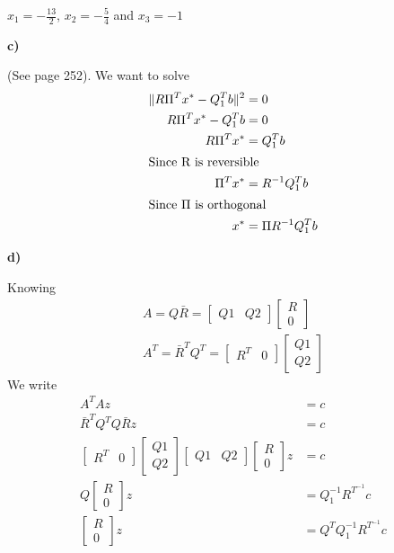 $x_1 = -\frac{13}{2}$, $x_2 = -\frac{5}{4}$ and $x_3 = -1$

\textbf{c)}

\answer

(See page 252). We want to solve 
\begin{align*}
	\| R \Pi^T x^* - Q_1^Tb\|^2 &= 0 \\
	R \Pi^T x^* - Q_1^Tb &= 0 \\
	R \Pi^T x^* &= Q_1^Tb \\
\intertext{Since R is reversible}
	\Pi^T x^*  &= R^{-1}Q_1^Tb \\
\intertext{Since $\Pi$ is orthogonal}
	x^* &= \Pi R^{-1}Q_1^Tb
\end{align*}
	
\textbf{d)}

\answer

Knowing
\begin{align*}
	A = Q\bar{R} = \begin{bmatrix}
		Q1 & Q2
	\end{bmatrix} \begin{bmatrix}
		R \\ 0
	\end{bmatrix}\\
	A^T = \bar{R}^T Q^T = \begin{bmatrix}
		R^T & 0
	\end{bmatrix}\begin{bmatrix}
		Q1\\ Q2
	\end{bmatrix}
\end{align*}
We write
\begin{align*}
	A^T A z &= c \\
	\bar{R}^T Q^T Q\bar{R}z &= c \\
	\begin{bmatrix}
		R^T & 0
	\end{bmatrix}\begin{bmatrix}
		Q1\\ Q2
	\end{bmatrix} \begin{bmatrix}
		Q1 & Q2
	\end{bmatrix} \begin{bmatrix}
		R \\ 0
	\end{bmatrix} z &= c\\
	Q\begin{bmatrix}
		R \\ 0
	\end{bmatrix} z &= Q_1^{-1}R^{T^{-1}}c \\
	\begin{bmatrix}
		R \\ 0
	\end{bmatrix} z &= Q^TQ_1^{-1}R^{T^{-1}}c \\
\end{align*}

